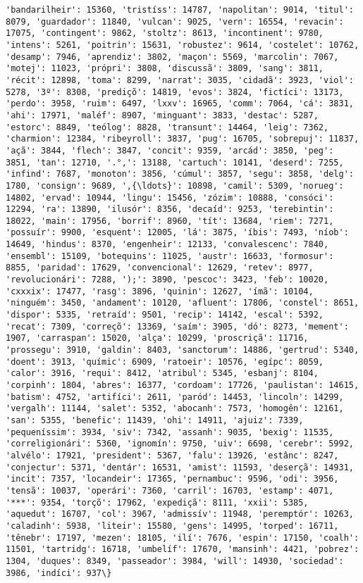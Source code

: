 \begin{Verbatim}[commandchars=\\\{\}]
'bandarilheir': 15360, 'tristíss': 14787, 'napolitan': 9014, 'titul': 8079, 'guardador': 11840, 'vulcan': 9025, 'vern': 16554, 'revacin': 17075, 'contingent': 9862, 'stoltz': 8613, 'incontinent': 9780, 'intens': 5261, 'poitrin': 15631, 'robustez': 9614, 'costelet': 10762, 'desamp': 7946, 'aprendiz': 3802, 'maçon': 5569, 'marcolin': 7067, 'motej': 11023, 'própri': 3808, 'discussã': 3809, 'sang': 3811, 'récit': 12898, 'toma': 8299, 'narrat': 3035, 'cidadã': 3923, 'viol': 5278, '3º': 8308, 'prediçõ': 14819, 'evos': 3824, 'fictíci': 13173, 'perdo': 3958, 'ruim': 6497, 'lxxv': 16965, 'comm': 7064, 'cá': 3831, 'ahi': 17971, 'maléf': 8907, 'minguant': 3833, 'destac': 5287, 'estorc': 8849, 'teólog': 8828, 'transunt': 14464, 'leig': 7362, 'charmion': 12384, 'ribeyroll': 3837, 'pug': 16705, 'sobrepuj': 11837, 'açã': 3844, 'flech': 3847, 'concit': 9359, 'arcád': 3850, 'peg': 3851, 'tan': 12710, '.°,': 13188, 'cartuch': 10141, 'deserd': 7255, 'infind': 7687, 'monoton': 3856, 'cúmul': 3857, 'segu': 3858, 'delg': 1780, 'consign': 9689, ',{\ldots}': 10898, 'camil': 5309, 'norueg': 14802, 'ervad': 10944, 'lingu': 15456, 'zózim': 10888, 'consóci': 12294, 'ra': 13890, 'ilusór': 8356, 'decaíd': 9253, 'terebintin': 18022, 'main': 17956, 'borrif': 8960, 'tít': 13684, 'riem': 7271, 'possuír': 9900, 'esquent': 12005, 'lá': 3875, 'íbis': 7493, 'níob': 14649, 'hindus': 8370, 'engenheir': 12133, 'convalescenc': 7840, 'ensembl': 15109, 'botequins': 11025, 'austr': 16633, 'formosur': 8855, 'paridad': 17629, 'convencional': 12629, 'retev': 8977, 'revolucionári': 7288, ');': 3890, 'pescoc': 3423, 'feb': 10020, 'cxxxix': 17477, 'rasg': 3896, 'quinin': 12627, 'ímã': 10104, 'ninguém': 3450, 'andament': 10120, 'afluent': 17806, 'constel': 8651, 'dispor': 5335, 'retraíd': 9501, 'recip': 14142, 'escal': 5392, 'recat': 7309, 'correçõ': 13369, 'saím': 3905, 'dó': 8273, 'mement': 1907, 'carraspan': 15020, 'alça': 10299, 'proscriçã': 11716, 'prossegu': 3910, 'galdin': 8403, 'sanctorum': 14886, 'gertrud': 5340, 'doent': 3913, 'químic': 6909, 'ratoeir': 10576, 'egípc': 8059, 'calor': 3916, 'requi': 8412, 'atribul': 5345, 'esbanj': 8104, 'corpinh': 1804, 'abres': 16377, 'cordoam': 17726, 'paulistan': 14615, 'batism': 4752, 'artifíci': 2611, 'paród': 14453, 'lincoln': 14299, 'vergalh': 11144, 'salet': 5352, 'abocanh': 7573, 'homogên': 12161, 'san': 5355, 'benefic': 11439, 'ohi': 14911, 'ajuiz': 7339, 'pequeníssim': 3934, 'siv': 7342, 'assanh': 9035, 'bexig': 11535, 'correligionári': 5360, 'ignomín': 9750, 'uiv': 6698, 'cerebr': 5992, 'alvélo': 17921, 'president': 5367, 'falu': 13926, 'estânc': 8247, 'conjectur': 5371, 'dentár': 16531, 'amist': 11593, 'deserçã': 14931, 'incit': 7357, 'locandeir': 17365, 'pernambuc': 9596, 'odi': 3956, 'tensã': 10037, 'operári': 7360, 'carril': 16703, 'estamp': 4071, '***': 9354, 'torçõ': 17962, 'expediçã': 8111, 'xxii': 5385, 'aquedut': 16707, 'col': 3967, 'admissív': 11948, 'peremptór': 10263, 'caladinh': 5938, 'liteir': 15580, 'gens': 14995, 'torped': 16711, 'tênebr': 17197, 'mezen': 18105, 'ilí': 7676, 'espin': 17150, 'coalh': 11501, 'tartridg': 16718, 'umbelíf': 17670, 'mansinh': 4421, 'pobrez': 1304, 'duques': 8349, 'passeador': 3984, 'will': 14930, 'sociedad': 3986, 'indíci': 937\}


\end{Verbatim}
